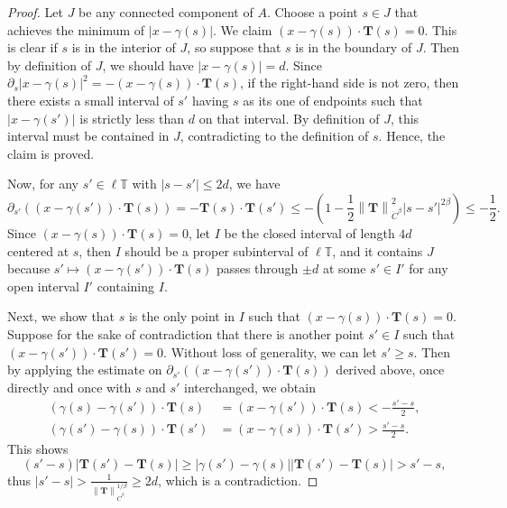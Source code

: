 \documentclass[reqno,centertags,12pt]{amsart}
\theoremstyle{definition}
\numberwithin{equation}{section}
\newcommand{\abs}[1]{\left\lvert#1\right\rvert}
\newcommand{\norm}[1]{\left\|#1\right\|}
\newcommand{\bbT}{{\mathbb{T}}}
\begin{document}
\begin{proof}
    Let $J$ be any connected component of $A$. Choose a point $s\in J$ that achieves
    the minimum of $\abs{x - \gamma(s)}$. We claim $(x - \gamma(s))\cdot\mathbf{T}(s) = 0$.
    This is clear if $s$ is in the interior of $J$, so suppose that $s$ is in the boundary
    of $J$. Then by definition of $J$, we should have $\abs{x - \gamma(s)} = d$.
    Since $\partial_{s}\abs{x - \gamma(s)}^{2} = -(x - \gamma(s))\cdot\mathbf{T}(s)$, if
    the right-hand side is not zero, then there exists a small interval of $s'$ having $s$
    as its one of endpoints such that $\abs{x - \gamma(s')}$ is strictly less than $d$
    on that interval. By definition of $J$, this interval must be contained in $J$,
    contradicting to the definition of $s$. Hence, the claim is proved.

    Now, for any $s'\in\ell\bbT$ with $\abs{s - s'} \leq 2d$, we have
    \[
        \partial_{s'}\left((x - \gamma(s'))\cdot\mathbf{T}(s)\right)
        = -\mathbf{T}(s)\cdot\mathbf{T}(s')
        \leq -\left(1 - \frac{1}{2}\norm{\mathbf{T}}_{\dot{C}^{\beta}}^{2}
        \abs{s - s'}^{2\beta}\right) \leq -\frac{1}{2}.
    \]
    Since $(x - \gamma(s))\cdot\mathbf{T}(s) = 0$, let $I$ be the closed interval of length
    $4d$ centered at $s$, then $I$ should be a proper subinterval of $\ell\bbT$, and it
    contains $J$ because $s'\mapsto (x - \gamma(s'))\cdot\mathbf{T}(s)$ passes through
    $\pm d$ at some $s'\in I'$ for any open interval $I'$ containing $I$.

    Next, we show that $s$ is the only point in $I$ such that
    $(x - \gamma(s))\cdot\mathbf{T}(s) = 0$. Suppose for the sake of contradiction that
    there is another point $s'\in I$ such that $(x - \gamma(s'))\cdot\mathbf{T}(s') = 0$.
    Without loss of generality, we can let $s'\geq s$. Then by applying the estimate on
    $\partial_{s'}\left((x - \gamma(s'))\cdot\mathbf{T}(s)\right)$ derived above,
    once directly and once with $s$ and $s'$ interchanged, we obtain
    \begin{align*}
        (\gamma(s) - \gamma(s'))\cdot\mathbf{T}(s)
        &= (x - \gamma(s'))\cdot\mathbf{T}(s) < -\frac{s' - s}{2}, \\
        (\gamma(s') - \gamma(s))\cdot\mathbf{T}(s')
        &= (x - \gamma(s))\cdot\mathbf{T}(s') > \frac{s' - s}{2}.
    \end{align*}
    This shows
    \[
        (s' - s)\abs{\mathbf{T}(s') - \mathbf{T}(s)}
        \geq \abs{\gamma(s') - \gamma(s)}\abs{\mathbf{T}(s') - \mathbf{T}(s)}
        > s' - s,
    \]
    thus $\abs{s' - s} > \frac{1}{\norm{\mathbf{T}}_{\dot{C}^{\beta}}^{1/\beta}} \geq 2d$,
    which is a contradiction.


\end{proof}
\end{document}
